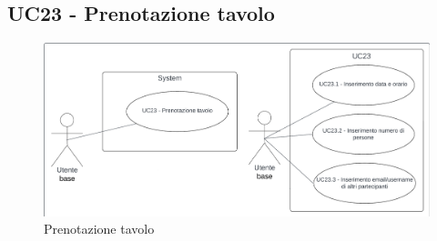\subsection{UC23 - Prenotazione tavolo}\label{usecase:23}

\begin{figure}[H]
  \centering
  \includegraphics[width=0.9\linewidth]{ucd/UCD23.png}
  \caption{Prenotazione tavolo}
\end{figure}

